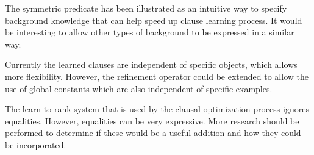 The symmetric predicate has been illustrated as an intuitive way to specify background knowledge that can help speed up clause learning process.
It would be interesting to allow other types of background to be expressed in a similar way.

Currently the learned clauses are independent of specific objects, which allows more flexibility.
However, the refinement operator could be extended to allow the use of global constants which are also independent of specific examples.

The learn to rank system that is used by the clausal optimization process ignores equalities.
However, equalities can be very expressive.
More research should be performed to determine if these would be a useful addition and how they could be incorporated.